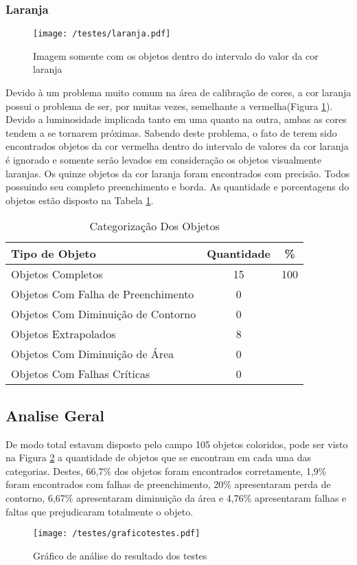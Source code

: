 \subsubsection{Laranja}
	\begin{figure}[H]
		\centering
		\texttt{[image: /testes/laranja.pdf]}
		\caption{Imagem somente com os objetos dentro do intervalo do valor da cor laranja}
		\label{fig:laranja}
	\end{figure}
	
	Devido à um problema muito comum na área de calibração de cores, a cor laranja possui o problema de ser, por muitas vezes, semelhante a vermelha(Figura \ref{fig:laranja}). Devido a luminosidade implicada tanto em uma quanto na outra, ambas as cores tendem a se tornarem próximas.
	Sabendo deste problema, o fato de terem sido encontrados objetos da cor vermelha dentro do intervalo de valores da cor laranja é ignorado e somente serão levados em consideração os objetos visualmente laranjas.
	Os quinze objetos da cor laranja foram encontrados com precisão. Todos possuindo seu completo preenchimento e borda. As quantidade e porcentagens do objetos estão disposto na Tabela \ref{tab:laranja}.
	
\begin{table}[h]
\centering
\begin{tabular}{l|c|c}
Tipo de Objeto & Quantidade  & \% \\ %
\hline                               %
Objetos Completos &  15 & 100 \\
\hline 
Objetos Com Falha de Preenchimento & 0 \\
\hline 
Objetos Com Diminuição de Contorno &  0 \\
\hline 
Objetos Extrapolados & 8 \\
\hline 
Objetos Com Diminuição de Área &  0 \\
\hline 
Objetos Com Falhas Críticas & 0 \\
\hline 
\end{tabular}
\caption{Categorização Dos Objetos}
\label{tab:laranja}
\end{table}
\newpage
\subsection{Analise Geral}
De modo total estavam disposto pelo campo 105 objetos coloridos, pode ser visto na Figura \ref{fig:total} a quantidade de objetos que se encontram em cada uma das categorias. Destes, 66,7\% dos objetos foram encontrados corretamente, 1,9\% foram encontrados com falhas de preenchimento, 20\% apresentaram perda de contorno, 6,67\% apresentaram diminuição da área e 4,76\% apresentaram falhas e faltas que prejudicaram totalmente o objeto.
	\begin{figure}[H]
		\centering
		\texttt{[image: /testes/graficotestes.pdf]}
		\caption{Gráfico de análise do resultado dos testes}
		\label{fig:total}
	\end{figure}
	
